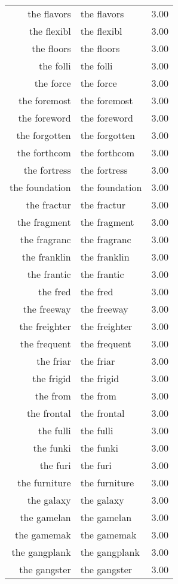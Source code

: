 \begin{table}[ht]
\begin{tabular}{rlr}
  the flavors & the flavors & 3.00 \\ 
  the flexibl & the flexibl & 3.00 \\ 
  the floors & the floors & 3.00 \\ 
  the folli & the folli & 3.00 \\ 
  the force & the force & 3.00 \\ 
  the foremost & the foremost & 3.00 \\ 
  the foreword & the foreword & 3.00 \\ 
  the forgotten & the forgotten & 3.00 \\ 
  the forthcom & the forthcom & 3.00 \\ 
  the fortress & the fortress & 3.00 \\ 
  the foundation & the foundation & 3.00 \\ 
  the fractur & the fractur & 3.00 \\ 
  the fragment & the fragment & 3.00 \\ 
  the fragranc & the fragranc & 3.00 \\ 
  the franklin & the franklin & 3.00 \\ 
  the frantic & the frantic & 3.00 \\ 
  the fred & the fred & 3.00 \\ 
  the freeway & the freeway & 3.00 \\ 
  the freighter & the freighter & 3.00 \\ 
  the frequent & the frequent & 3.00 \\ 
  the friar & the friar & 3.00 \\ 
  the frigid & the frigid & 3.00 \\ 
  the from & the from & 3.00 \\ 
  the frontal & the frontal & 3.00 \\ 
  the fulli & the fulli & 3.00 \\ 
  the funki & the funki & 3.00 \\ 
  the furi & the furi & 3.00 \\ 
  the furniture & the furniture & 3.00 \\ 
  the galaxy & the galaxy & 3.00 \\ 
  the gamelan & the gamelan & 3.00 \\ 
  the gamemak & the gamemak & 3.00 \\ 
  the gangplank & the gangplank & 3.00 \\ 
  the gangster & the gangster & 3.00 \\ 

\end{tabular}
\end{table}
